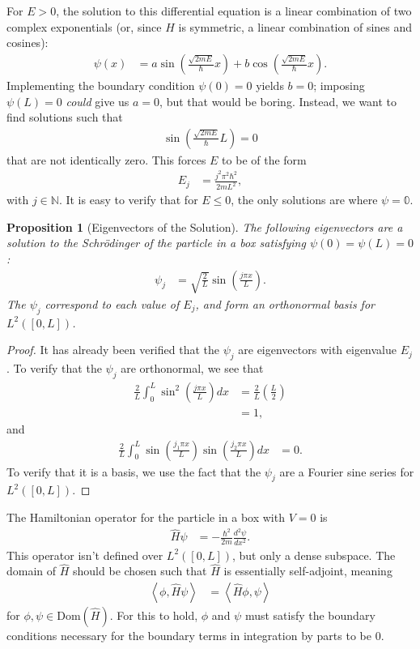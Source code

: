 \documentclass[10pt]{extarticle}
\newcommand{\N}{\mathbb{N}}
\newcommand{\iprod}[2]{\left\langle #1,#2\right\rangle}
\theoremstyle{plain}
\newtheorem*{proposition}{Proposition}%
\theoremstyle{definition}
\theoremstyle{remark}
\begin{document}
  For $E > 0$, the solution to this differential equation is a linear combination of two complex exponentials (or, since $\hat{H}$ is symmetric, a linear combination of sines and cosines):
  \begin{align*}
    \psi(x) &= a\sin\left(\frac{\sqrt{2mE}}{\hbar}x\right) + b\cos\left(\frac{\sqrt{2mE}}{\hbar}x\right).
  \end{align*}
  Implementing the boundary condition $\psi(0) = 0$ yields $b = 0$; imposing $\psi(L) = 0$ \textit{could} give us $a = 0$, but that would be boring. Instead, we want to find solutions such that
  \begin{align*}
    \sin \left(\frac{\sqrt{2mE}}{\hbar}L\right) = 0
  \end{align*}
  that are not identically zero. This forces $E$ to be of the form
  \begin{align*}
    E_j &= \frac{j^2\pi^2\hbar^2}{2mL^2},
  \end{align*}
  with $j \in \N$. It is easy to verify that for $E \leq 0$, the only solutions are where $\psi = \mathbb{0}$.
  \begin{proposition}[Eigenvectors of the Solution]
    The following eigenvectors are a solution to the Schrödinger of the particle in a box satisfying $\psi(0) = \psi(L) = 0$:
    \begin{align*}
      \psi_j &= \sqrt{\frac{2}{L}}\sin\left(\frac{j\pi x}{L}\right).
    \end{align*}
    The $\psi_j$ correspond to each value of $E_j$, and form an orthonormal basis for $L^{2}([0,L])$.
  \end{proposition}
  \begin{proof}
    It has already been verified that the $\psi_j$ are eigenvectors with eigenvalue $E_j$. To verify that the $\psi_j$ are orthonormal, we see that
    \begin{align*}
      \frac{2}{L}\int_{0}^{L}\sin^2\left(\frac{j\pi x}{L}\right)dx &= \frac{2}{L}\left(\frac{L}{2}\right)\\
                                                                   &= 1,
    \end{align*}
    and
    \begin{align*}
      \frac{2}{L}\int_{0}^{L}\sin\left(\frac{j_1\pi x}{L}\right) \sin\left(\frac{j_2\pi x}{L}\right) dx &= 0.
    \end{align*}
    To verify that it is a basis, we use the fact that the $\psi_j$ are a Fourier sine series for $L^{2}([0,L])$.
  \end{proof}
  The Hamiltonian operator for the particle in a box with $V = 0$ is
  \begin{align*}
    \hat{H}\psi &= -\frac{\hbar^2}{2m}\frac{d^2\psi}{dx^2}.
  \end{align*}
  This operator isn't defined over $L^{2}([0,L])$, but only a dense subspace. The domain of $\hat{H}$ should be chosen such that $\hat{H}$ is essentially self-adjoint, meaning
  \begin{align*}
    \iprod{\phi}{\hat{H}\psi} &= \iprod{\hat{H}\phi}{\psi}
  \end{align*}
  for $\phi,\psi \in \text{Dom}(\hat{H})$. For this to hold, $\phi$ and $\psi$ must satisfy the boundary conditions necessary for the boundary terms in integration by parts to be $0$.
\end{document}
